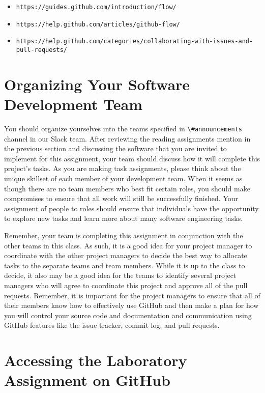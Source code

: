 \documentclass[11pt]{article}
\newcommand{\url}[1]{\lstinline{#1}}
\newcommand{\channel}[1]{\lstinline{#1}}
\begin{document}
\vspace*{-.5em}

\begin{itemize}
  \setlength{\itemsep}{0pt}
  \item \url{https://guides.github.com/introduction/flow/}
  \item \url{https://help.github.com/articles/github-flow/}
  \item \url{https://help.github.com/categories/collaborating-with-issues-and-pull-requests/}
\end{itemize}

\vspace*{-1em}

\section*{Organizing Your Software Development Team}

You should organize yourselves into the teams specified in \channel{\#announcements} channel in our Slack team. After
reviewing the reading assignments mention in the previous section and discussing the software that you are invited to
implement for this assignment, your team should discuss how it will complete this project's tasks. As you are making
task assignments, please think about the unique skillset of each member of your development team. When it seems as
though there are no team members who best fit certain roles, you should make compromises to ensure that all work will
still be successfully finished. Your assignment of people to roles should ensure that individuals have the opportunity
to explore new tasks and learn more about many software engineering tasks.

Remember, your team is completing this assignment in conjunction with the other teams in this class. As such, it is a
good idea for your project manager to coordinate with the other project managers to decide the best way to allocate
tasks to the separate teams and team members. While it is up to the class to decide, it also may be a good idea for the
teams to identify several project managers who will agree to coordinate this project and approve all of the pull
requests. Remember, it is important for the project managers to ensure that all of their members know how to effectively
use GitHub and then make a plan for how you will control your source code and documentation and communication using
GitHub features like the issue tracker, commit log, and pull requests.

\section*{Accessing the Laboratory Assignment on GitHub}
\end{document}
